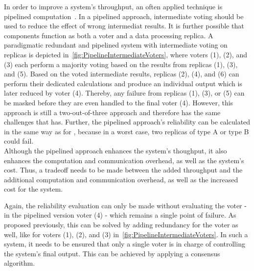 In order to improve a system's throughput, an often applied technique is pipelined computation~\cite{TanenbaumSteen07}.
In a pipelined approach, intermediate voting should be used to reduce the effect of wrong intermediat results.
It is further possible that components function as both a voter and a data processing replica.
A paradigmatic redundant and pipelined system with intermediate voting on replicas is depicted in~\autoref{fig:PipelineIntermediateVoters}, where voters (1), (2), and (3) each perform a majority voting based on the results from replicas (1), (3), and (5).
Based on the voted intermediate results, replicas (2), (4), and (6) can perform their dedicated calculations and produce an individual output which is later reduced by voter (4).
Thereby, any failure from replicas (1), (3), or (5) can be masked before they are even handled to the final voter (4).
However, this approach is still a two-out-of-three approach and therefore has the same challenges that  has.
Further, the pipelined approach's reliability can be calculated in the same way as for , because in a worst case, two replicas of type A or type B could fail.
\\

Although the pipelined approach enhances the system's thoughput, it also enhances the computation and communication overhead, as well as the system's cost.
Thus, a tradeoff needs to be made between the added throughput and the additional computation and communication overhead, as well as the increased cost for the system.

Again, the reliability evaluation can only be made without evaluating the voter - in the pipelined version voter (4) - which remains a single point of failure.
As proposed previously, this can be solved by adding redundancy for the voter as well, like for voters (1), (2), and (3) in~\autoref{fig:PipelineIntermediateVoters}.
In such a system, it needs to be ensured that only a single voter is in charge of controlling the system's final output.
This can be achieved by applying a consensus algorithm.

